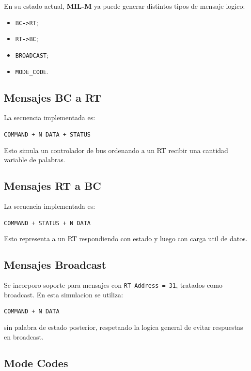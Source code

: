 \documentclass[12pt,a4paper]{article}
\begin{document}
En su estado actual, \textbf{MIL-M} ya puede generar distintos tipos de mensaje logico:

\begin{itemize}
    \item \texttt{BC->RT};
    \item \texttt{RT->BC};
    \item \texttt{BROADCAST};
    \item \texttt{MODE\_CODE}.
\end{itemize}

\subsection{Mensajes BC a RT}

La secuencia implementada es:

\begin{center}
\texttt{COMMAND + N DATA + STATUS}
\end{center}

Esto simula un controlador de bus ordenando a un RT recibir una cantidad variable de palabras.

\subsection{Mensajes RT a BC}

La secuencia implementada es:

\begin{center}
\texttt{COMMAND + STATUS + N DATA}
\end{center}

Esto representa a un RT respondiendo con estado y luego con carga util de datos.

\subsection{Mensajes Broadcast}

Se incorporo soporte para mensajes con \texttt{RT Address = 31}, tratados como broadcast. En
esta simulacion se utiliza:

\begin{center}
\texttt{COMMAND + N DATA}
\end{center}

sin palabra de estado posterior, respetando la logica general de evitar respuestas en broadcast.

\subsection{Mode Codes}
\end{document}
